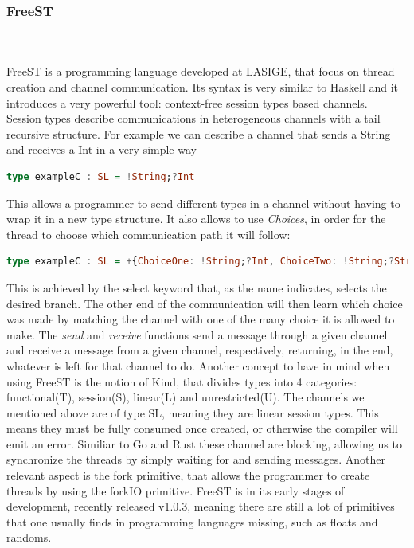 \documentclass[runningheads]{llncs}
\begin{document}
\subsubsection{FreeST}\hfill\\\\
FreeST is a programming language developed at LASIGE, that focus on thread creation and channel communication. Its syntax is very similar to Haskell and it introduces a very powerful tool: context-free session types based channels.\\
Session types describe communications in heterogeneous channels with a tail recursive structure\cite{session}.
For example we can describe a channel that sends a String and receives a Int in a very simple way
\begin{lstlisting}[language=haskell]
type exampleC : SL = !String;?Int
\end{lstlisting}
This allows a programmer to send different types in a channel without having to wrap it in a new type structure.
It also allows to use {\it Choices}, in order for the thread to choose which communication path it will follow:
\begin{lstlisting}[language=haskell]
type exampleC : SL = +{ChoiceOne: !String;?Int, ChoiceTwo: !String;?String}
\end{lstlisting}
This is achieved by the select keyword that, as the name indicates, selects the desired branch. The other end of the communication will then learn which choice was made by matching the channel with one of the many choice it is allowed to make.
The {\it send} and {\it receive} functions send a message through a given channel and receive a message from a given channel, respectively, returning, in the end, whatever is left for that channel to do.
Another concept to have in mind when using FreeST is the notion of Kind, that divides types into 4 categories:
functional(T), session(S), linear(L) and unrestricted(U).
The channels we mentioned above are of type SL, meaning they are linear session types. This means they must be fully consumed once created, or otherwise the compiler will emit an error.
Similiar to Go and Rust these channel are blocking, allowing us to synchronize the threads by simply waiting for and sending messages.
Another relevant aspect is the fork primitive, that allows the programmer to create threads by using the forkIO primitive\cite{freest}.
FreeST is in its early stages of development, recently released v1.0.3, meaning there are still a lot of primitives that one usually finds in programming languages missing, such as floats and randoms.
\end{document}
